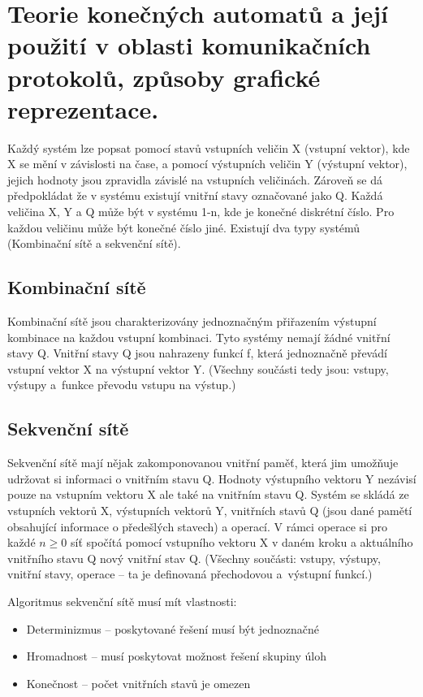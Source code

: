 \clearpage
\section{Teorie konečných automatů a její použití v oblasti komunikačních protokolů, způsoby grafické reprezentace.}

Každý systém lze popsat pomocí stavů vstupních veličin X (vstupní vektor), kde X se mění v závislosti na čase, a pomocí výstupních veličin Y (výstupní vektor), jejich hodnoty jsou zpravidla závislé na vstupních veličinách.
Zároveň se dá předpokládat že v systému existují vnitřní stavy označované jako Q.
Každá veličina X, Y a Q může být v systému 1-n, kde je konečné diskrétní číslo.
Pro každou veličinu může být konečné číslo jiné.
Existují dva typy systémů (Kombinační sítě a sekvenční sítě).

\subsection{Kombinační sítě}

Kombinační sítě jsou charakterizovány jednoznačným přiřazením výstupní kombinace na každou vstupní kombinaci.
Tyto systémy nemají žádné vnitřní stavy Q.
Vnitřní stavy Q jsou nahrazeny funkcí f, která jednoznačně převádí vstupní vektor X na výstupní vektor Y. (Všechny součásti tedy jsou: vstupy, výstupy a~funkce převodu vstupu na výstup.)

\subsection{Sekvenční sítě}

Sekvenční sítě mají nějak zakomponovanou vnitřní paměť, která jim umožňuje udržovat si informaci o vnitřním stavu Q.
Hodnoty výstupního vektoru Y nezávisí pouze na vstupním vektoru X ale také na vnitřním stavu Q.
Systém se skládá ze vstupních vektorů X, výstupních vektorů Y, vnitřních stavů Q (jsou dané pamětí obsahující informace o předešlých stavech) a operací.
V rámci operace si pro každé $n\ge0$ síť spočítá pomocí vstupního vektoru X v daném kroku a aktuálního vnitřního stavu Q nový vnitřní stav Q. (Všechny součásti: vstupy, výstupy, vnitřní stavy, operace -- ta je definovaná přechodovou a~výstupní funkcí.) 

Algoritmus sekvenční sítě musí mít vlastnosti:
\begin{itemize}[noitemsep]
    \item Determinizmus -- poskytované řešení musí být jednoznačné
    \item Hromadnost -- musí poskytovat možnost řešení skupiny úloh
    \item Konečnost -- počet vnitřních stavů je omezen
\end{itemize}


